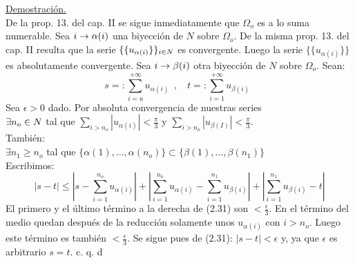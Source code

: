 \underline{Demostración.}\\
De la prop. 13. del cap. II se sigue inmediatamente que $\Omega_o$ es a lo suma numerable. Sea $i \rightarrow \alpha (i)$ una biyección de $N$ sobre $\Omega_o$. De la misma prop. 13. del cap. II resulta que la serie $\lbrace \lbrace u_{\alpha (i)} \rbrace\rbrace_{i \in N}$ es convergente. Luego la serie $\lbrace \lbrace u_{\alpha (i)} \rbrace\rbrace$ es absolutamente convergente. Sea $i \rightarrow \beta (i)$ otra biyección de $N$ sobre $\Omega_o$. Sean:
$$
s=:\sum_{i=u}^{+ \infty}u_{\alpha (i)} \phantom{s}, \phantom{ss} t=:\sum_{i=1}^{+ \infty}u_{\beta (i)} \phantom{s}
$$
Sea $\epsilon >0$ dado. Por absoluta convergencia de nuestras series \\
$\exists n_o \in N$ tal que $\sum_{i>n_o}| u_{\alpha (i)} | < \frac{\pi}{3}$ y $\sum_{i>n_o} | u_{\beta (I)}| < \frac{\pi}{3}$. \\
También: \\
$\exists n_1 \geq n_o$ tal que $\lbrace {\alpha (1)}, \ldots , \alpha (n_o) \rbrace \subset \lbrace \beta (1), \ldots, \beta (n_1) \rbrace$ \\
Escribimos:
\begin{equation}
|s-t| \leq |s-\sum_{i=1}^{n_o}u_{\alpha (i)} | + |\sum_{i=1}^{n_o}u_{\alpha (i)}-\sum_{i=1}^{n_1}u_{\beta (i)}|+ | \sum_{i=1}^{n_1}u_{\beta (i)}-t|
\end{equation}
El primero y el último término a la derecha de (2.31) son $< \frac{\epsilon}{3}$. En el término del medio quedan después de la reducción solamente unos $u_{\alpha (i)}$ con $i> n_o$. Luego este término es también $<\frac{\epsilon}{3}$. Se sigue pues de (2.31): $|s-t| < \epsilon$ y, ya que $\epsilon$ es arbitrario $s=t$.
\phantom{sssssssssssssssssssssssssssssssssss sasdasdasdasdadadssada} c. q. d \\ \\

